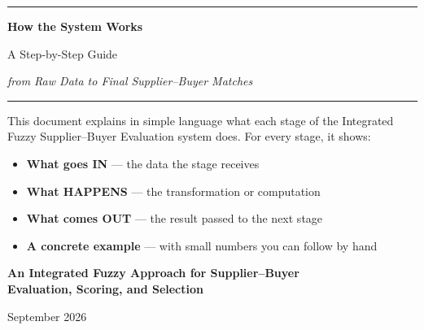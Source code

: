 \documentclass[11pt]{article}
\begin{document}
\hypersetup{pageanchor=false}

\begin{titlepage}
\setlength{\parskip}{0pt}
\thispagestyle{empty}
\centering

\vspace*{1.5cm}

{\color{ejustblue}\rule{0.78\textwidth}{1.6pt}\par}
\vspace{0.5cm}
{\huge\bfseries How the System Works\par}
\vspace{0.3cm}
{\LARGE A Step-by-Step Guide\par}
\vspace{0.15cm}
{\Large\itshape from Raw Data to Final Supplier--Buyer Matches\par}
\vspace{0.5cm}
{\color{ejustblue}\rule{0.78\textwidth}{1.6pt}\par}

\vspace{1.2cm}

{\large This document explains in simple language what each stage of the Integrated Fuzzy Supplier--Buyer Evaluation system does. For every stage, it shows:\par}

\vspace{0.6cm}

\begin{minipage}{0.75\textwidth}
\begin{itemize}[leftmargin=2em, itemsep=0.5em]
  \item[\textcolor{inputcolor}{$\blacktriangleright$}] \textbf{What goes IN} --- the data the stage receives
  \item[\textcolor{processcolor}{$\blacktriangleright$}] \textbf{What HAPPENS} --- the transformation or computation
  \item[\textcolor{outputcolor}{$\blacktriangleright$}] \textbf{What comes OUT} --- the result passed to the next stage
  \item[\textcolor{black}{$\blacktriangleright$}] \textbf{A concrete example} --- with small numbers you can follow by hand
\end{itemize}
\end{minipage}

\vspace{2cm}

{\large\bfseries An Integrated Fuzzy Approach for Supplier--Buyer\\Evaluation, Scoring, and Selection\par}

\vspace{1cm}
{\large September 2026\par}

\end{titlepage}
\end{document}
